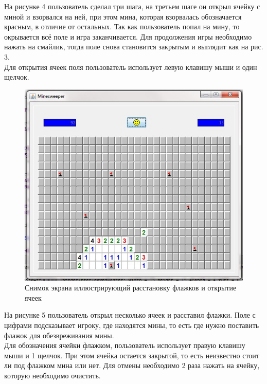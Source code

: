 На рисунке 4 пользователь сделал три шага, на третьем шаге он открыл ячейку с миной и взорвался на ней, при этом мина, которая взорвалась обозначается красным, в отличие от остальных. Так как пользователь попал на мину, то окрывается всё поле и игра заканчивается. Для продолжения игры необходимо нажать на смайлик, тогда поле снова становится закрытым и выглядит как на рис. 3.\\

Для открытия ячеек поля пользователь использует левую клавишу мыши и один щелчок.

\begin{figure}[H]
	\begin{center}
		\includegraphics[scale=0.7]{images/3.jpg}
		\caption{Снимок экрана иллюстрирующий расстановку флажков и открытие ячеек} 
		\label{pic:pic_name} %
	\end{center}
\end{figure}

На рисунке 5 пользователь открыл несколько ячеек и расставил флажки. Поле с цифрами подсказывает игроку, где находятся мины, то есть где нужно поставить флажок для обезвреживания мины.\\

Для обозначения ячейки флажком, пользователь использует правую клавишу мыши и 1 щелчок. При этом ячейка остается закрытой, то есть неизвестно стоит ли под флажком мина или нет. Для отмены необходимо 2 раза нажать на ячейку, которую необходимо очистить.

